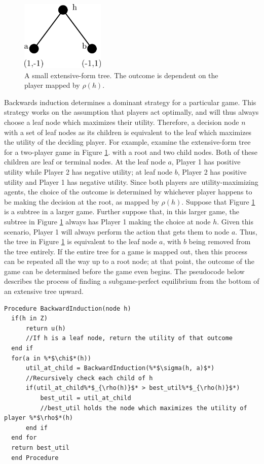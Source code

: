 \begin{figure}[H]
  \centering
  \includegraphics[width=4cm]{figures/ExampleBackwardInduction.png}
  \caption{A small extensive-form tree. The outcome is dependent on the player mapped by $\rho(h)$.}
  \label{fig:BackwardInduction}
\end{figure}

Backwards induction determines a dominant strategy for a particular game. This strategy works on the assumption that players act optimally, and will thus always choose a leaf node which maximizes their utility. Therefore, a decision node $n$ with a set of leaf nodes as its children is equivalent to the leaf which maximizes the utility of the deciding player. For example, examine the extensive-form tree for a two-player game in Figure \ref{fig:BackwardInduction}. with a root and two child nodes. Both of these children are leaf or terminal nodes. At the leaf node $a$, Player 1 has positive utility while Player 2 has negative utility; at leaf node $b$, Player 2 has positive utility and Player 1 has negative utility. Since both players are utility-maximizing agents, the choice of the outcome is determined by whichever player happens to be making the decision at the root, as mapped by $\rho(h)$. Suppose that Figure \ref{fig:BackwardInduction} is a subtree in a larger game. Further suppose that, in this larger game, the subtree in Figure \ref{fig:BackwardInduction} always has Player 1 making the choice at node $h$. Given this scenario, Player 1 will always perform the action that gets them to node $a$. Thus, the tree in Figure \ref{fig:BackwardInduction} is equivalent to the leaf node $a$, with $b$ being removed from the tree entirely. If the entire tree for a game is mapped out, then this process can be repeated all the way up to a root node; at that point, the outcome of the game can be determined before the game even begins. The pseudocode below describes the process of finding a subgame-perfect equilibrium from the bottom of an extensive tree upward.\\

\begin{lstlisting}[language=pseudocode]
  Procedure BackwardInduction(node h)
  if(h in Z)
      return u(h)
      //If h is a leaf node, return the utility of that outcome
  end if
  for(a in %*$\chi$*(h))
      util_at_child = BackwardInduction(%*$\sigma(h, a)$*)
      //Recursively check each child of h
      if(util_at_child%*$_{\rho(h)}$* > best_util%*$_{\rho(h)}$*)
          best_util = util_at_child
          //best_util holds the node which maximizes the utility of player %*$\rho$*(h)
      end if
  end for
  return best_util
  end Procedure
\end{lstlisting}

